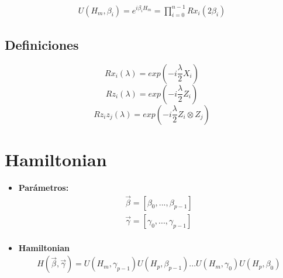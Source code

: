 \documentclass{article}
\begin{document}
\begin{align*}
  U(H_m, \beta_i) = e^{i \beta_i H_m} = \prod_{i=0}^{n-1}Rx_i(2\beta_i)
\end{align*}

\subsection{Definiciones}
\begin{equation*}
  Rx_i(\lambda) = exp(-i\frac{\lambda}{2}X_i)
\end{equation*}
\begin{equation*}
  Rz_i(\lambda) = exp(-i\frac{\lambda}{2}Z_i)
\end{equation*}
\begin{equation*}
  Rz_iz_j(\lambda) = exp(-i\frac{\lambda}{2}Z_i \otimes Z_j)
\end{equation*}

\section{Hamiltonian}
\begin{itemize}
\item \textbf{Parámetros:}
  \begin{align*}
    \vec{\beta} = [\beta_0, ..., \beta_{p-1}]\\
    \vec{\gamma} = [\gamma_0, ..., \gamma_{p-1}]\\
  \end{align*}

\item \textbf{Hamiltonian}
  \begin{align*}
    H(\vec{\beta}, \vec{\gamma}) = U(H_m, \gamma_{p-1})U(H_p, \beta_{p-1}) ... U(H_m, \gamma_0)U(H_p, \beta_0)
  \end{align*}

\end{itemize}
\end{document}
